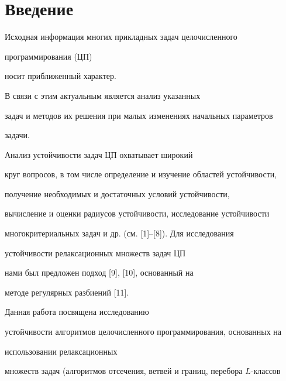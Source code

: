 

\maketitle


\label{begin}











\section*{Введение}








Исходная информация  многих прикладных задач целочисленного


программирования (ЦП)


носит приближенный характер.


В связи с этим актуальным является анализ указанных


задач и методов их решения при малых изменениях начальных параметров


задачи.  


Анализ устойчивости задач ЦП охватывает широкий


круг вопросов, в том числе определение и изучение областей устойчивости,


получение необходимых и достаточных условий устойчивости,


вычисление и оценки радиусов устойчивости, исследование устойчивости


многокритериальных задач и др. (см. [1]--[8]). Для исследования


устойчивости релаксационных множеств задач ЦП


нами был предложен подход [9], [10], основанный на


методе регулярных разбиений [11].                                     





Данная работа посвящена исследованию


устойчивости алгоритмов целочисленного программирования, основанных на


использовании релаксационных


множеств задач (алгоритмов отсечения, ветвей и границ, перебора $L$-классов


